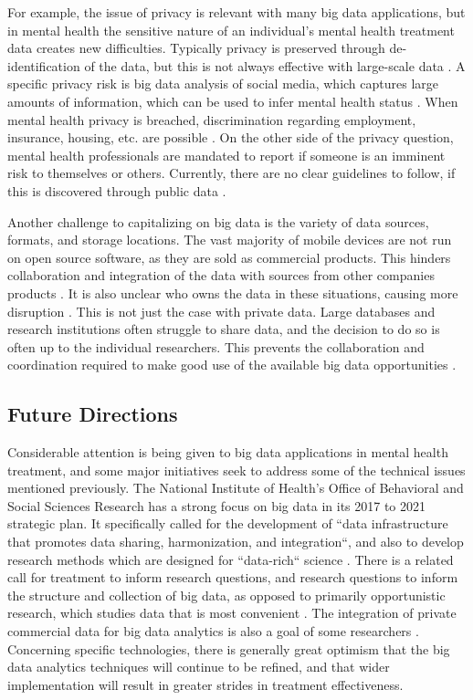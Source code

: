 \documentclass[sigconf]{acmart}
\begin{document}
For example, the issue of privacy is relevant with many big data applications, but in mental health the sensitive nature of an individual's mental health treatment data creates new difficulties. Typically privacy is preserved through de-identification of the data, but this is not always effective with large-scale data \cite{bigdatabipolar}. A specific privacy risk is big data analysis of social media, which captures large amounts of information, which can be used to infer mental health status \cite{detectdepressionsocialmedia}. When mental health privacy is breached, discrimination regarding employment, insurance, housing, etc. are possible \cite{bigdatabipolar}. On the other side of the privacy question, mental health professionals are mandated to report if someone is an imminent risk to themselves or others. Currently, there are no clear guidelines to follow, if this is discovered through public data \cite{detectdepressionsocialmedia}.

Another challenge to capitalizing on big data is the variety of data sources, formats, and storage locations. The vast majority of mobile devices are not run on open source software, as they are sold as commercial products. This hinders collaboration and integration of the data with sources from other companies products \cite{bdfragment}. It is also unclear who owns the data in these situations, causing more disruption \cite{bigdatabipolar}. This is not just the case with private data. Large databases and research institutions often struggle to share data, and the decision to do so is often up to the individual researchers. This prevents the collaboration and coordination required to make good use of the available big data opportunities \cite{openinfrastructure}.

\subsection{Future Directions}

Considerable attention is being given to big data applications in mental health treatment, and some major initiatives seek to address some of the technical issues mentioned previously. The National Institute of Health's Office of Behavioral and Social Sciences Research has a strong focus on big data in its 2017 to 2021 strategic plan. It specifically called for the development of ``data infrastructure that promotes data sharing, harmonization, and integration``, and also to develop research methods which are designed for ``data-rich`` science \cite{nihstrategy}. There is a related call for treatment to inform research questions, and research questions to inform the structure and collection of big data, as opposed to primarily opportunistic research, which studies data that is most convenient \cite{bdmhtxfuture}.  The integration of private commercial data for big data analytics is also a goal of some researchers \cite{bdfragment}. Concerning specific technologies, there is generally great optimism that the big data analytics techniques will continue to be refined, and that wider implementation will result in greater strides in treatment effectiveness. 
\end{document}
